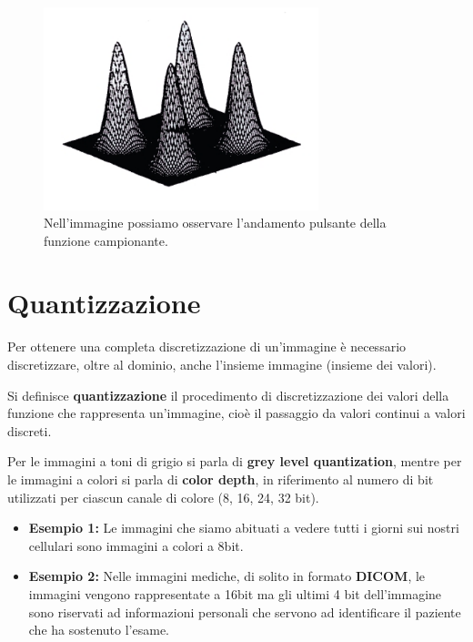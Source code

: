 \begin{figure}[H]
    \centering
    \includegraphics[width=8cm, keepaspectratio]{capitoli/immagini/imgs/puzzante.png}
    \caption{Nell'immagine possiamo osservare l'andamento pulsante della funzione campionante.}
\end{figure}

\section{Quantizzazione}
Per ottenere una completa discretizzazione di un'immagine è necessario
discretizzare, oltre al dominio, anche l'insieme immagine (insieme dei valori).
\begin{definition}
    Si definisce \textbf{quantizzazione} il procedimento di discretizzazione dei
    valori della funzione che rappresenta un'immagine, cioè il passaggio da
    valori continui a valori discreti.
\end{definition}
Per le immagini a toni di grigio si parla di \textbf{grey level quantization},
mentre per le immagini a colori si parla di \textbf{color depth}, in riferimento
al numero di bit utilizzati per ciascun canale di colore (8, 16, 24, 32 bit).
\begin{itemize}
    \item \textbf{Esempio 1:} Le immagini che siamo abituati a vedere tutti i giorni sui nostri cellulari
          sono immagini a colori a 8bit.
    \item \textbf{Esempio 2:} Nelle immagini mediche, di solito in formato
          \textbf{DICOM}, le immagini vengono rappresentate a 16bit ma gli
          ultimi 4 bit dell'immagine sono riservati ad informazioni personali
          che servono ad identificare il paziente che ha sostenuto l'esame.
\end{itemize}
